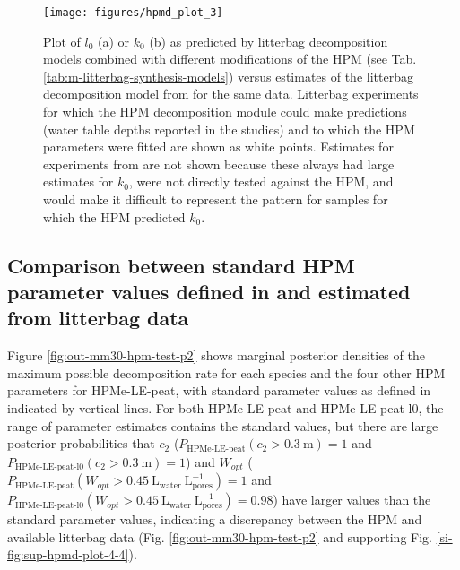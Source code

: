 \documentclass[esd, manuscript]{copernicus}
\begin{document}
\begin{figure}[H]

{\centering \texttt{[image: figures/hpmd\_plot\_3]} 

}

\caption{Plot of \(l_0\) (a) or \(k_0\) (b) as predicted by litterbag decomposition models combined with different modifications of the HPM (see Tab. \ref{tab:m-litterbag-synthesis-models}) versus estimates of the litterbag decomposition model from \citet{Teickner.2024f} for the same data. Litterbag experiments for which the HPM decomposition module could make predictions (water table depths reported in the studies) and to which the HPM parameters were fitted are shown as white points. Estimates for experiments from \citet{Hagemann.2015} are not shown because these always had large estimates for \(k_0\), were not directly tested against the HPM, and would make it difficult to represent the pattern for samples for which the HPM predicted \(k_0\).}\label{fig:out-sdm-all-models-p2}
\end{figure}

\subsection{\texorpdfstring{Comparison between standard HPM parameter values defined in \citet{Frolking.2010} and estimated from litterbag data}{Comparison between standard HPM parameter values defined in @Frolking.2010 and estimated from litterbag data}}

Figure \ref{fig:out-mm30-hpm-test-p2} shows marginal posterior densities of the maximum possible decomposition rate for each species and the four other HPM parameters for HPMe-LE-peat, with standard parameter values as defined in \citet{Frolking.2010} indicated by vertical lines. For both HPMe-LE-peat and HPMe-LE-peat-l0, the range of parameter estimates contains the standard values, but there are large posterior probabilities that \(c_2\) (\(P_\text{HPMe-LE-peat}(c_2>0.3~\mathrm{m}) = 1\) and \(P_\text{HPMe-LE-peat-l0}(c_2>0.3~\mathrm{m}) = 1\)) and \(W_{opt}\) (\(P_\text{HPMe-LE-peat}(W_{opt}>0.45~\mathrm{L}_\mathrm{water}~\mathrm{L}_\mathrm{pores}^{-1}) = 1\) and \(P_\text{HPMe-LE-peat-l0}(W_{opt}>0.45~\mathrm{L}_\mathrm{water}~\mathrm{L}_\mathrm{pores}^{-1}) = 0.98\)) have larger values than the standard parameter values, indicating a discrepancy between the HPM and available litterbag data (Fig. \ref{fig:out-mm30-hpm-test-p2} and supporting Fig. \ref{si-fig:sup-hpmd-plot-4-4}).
\end{document}

